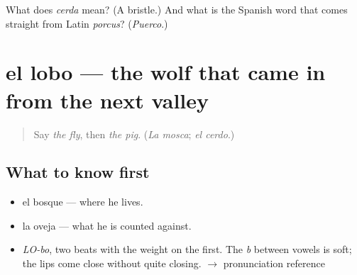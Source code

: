 \begin{tcolorbox}[breakable,colback=teal!4,colframe=teal!35!black,title={Before you move on}]
What does \emph{cerda} mean? (A bristle.) And what is the Spanish word that comes straight from Latin \emph{porcus}? (\emph{Puerco}.)
\end{tcolorbox}
\section[el lobo]{el lobo — the wolf that came in from the next valley}

\label{lesson:ES-C368-lobo}



\begin{quote}
Say \emph{the fly}, then \emph{the pig}. (\emph{La mosca}; \emph{el cerdo}.)
\end{quote}

\subsection*{What to know first}
\begin{itemize}
\raggedright
  \item el bosque — where he lives.
  \item la oveja — what he is counted against.
\end{itemize}

\begin{sounds}
\begin{itemize}
\raggedright
  \item \emph{LO-bo}, two beats with the weight on the first. The \emph{b} between vowels is soft; the lips come close without quite closing. $\to$ pronunciation reference
\end{itemize}
\end{sounds}

